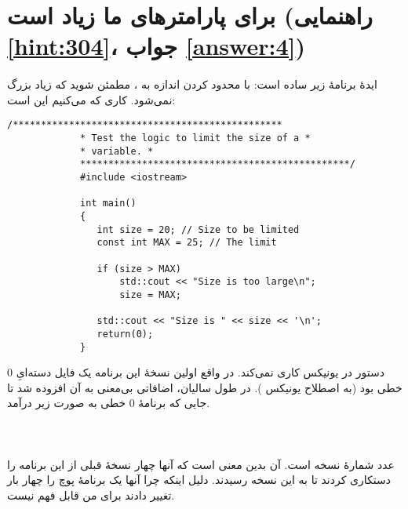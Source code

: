 \section[برای پارامترهای ما زیاد است]{برای پارامترهای ما زیاد است \protect{} (راهنمایی \ref{hint:304}، جواب \ref{answer:4})}
\paragraph{}\label{prog:22}
ایدهٔ برنامهٔ زیر ساده است: با محدود کردن اندازه به ، مطمئن شوید که زیاد بزرگ نمی‌شود. کاری که می‌کنیم این است:

\begin{LTR}
        \begin{lstlisting}[style=C++Style]
             /************************************************
             * Test the logic to limit the size of a *
             * variable. *
             ************************************************/
             #include <iostream>

             int main()
             {
             	int size = 20; // Size to be limited
             	const int MAX = 25; // The limit

             	if (size > MAX)
             		std::cout << "Size is too large\n";
             		size = MAX;

             	std::cout << "Size is " << size << '\n';
             	return(0);
             }
        \end{lstlisting}
\end{LTR}

\begin{tcolorbox}
دستور  در یونیکس کاری نمی‌کند. در واقع اولین نسخهٔ این برنامه یک فایل دسته‌ایِ 0 خطی بود (به اصطلاح یونیکس ). در طول سالیان، اضافاتی بی‌معنی به آن افزوده شد تا جایی که برنامهٔ 0 خطی به صورت زیر درآمد.
\LTR
{}\\
\lr{\texttt{\#}}\\
\\
\lr{\texttt{\#}}\\
\RTL
عدد  شمارهٔ نسخه است. آن بدین معنی است که آنها چهار نسخهٔ قبلی از این برنامه را دستکاری کردند تا به این نسخه رسیدند. دلیل اینکه چرا آنها یک برنامهٔ پوچ را چهار بار تغییر دادند برای من قابل فهم نیست.
\end{tcolorbox}